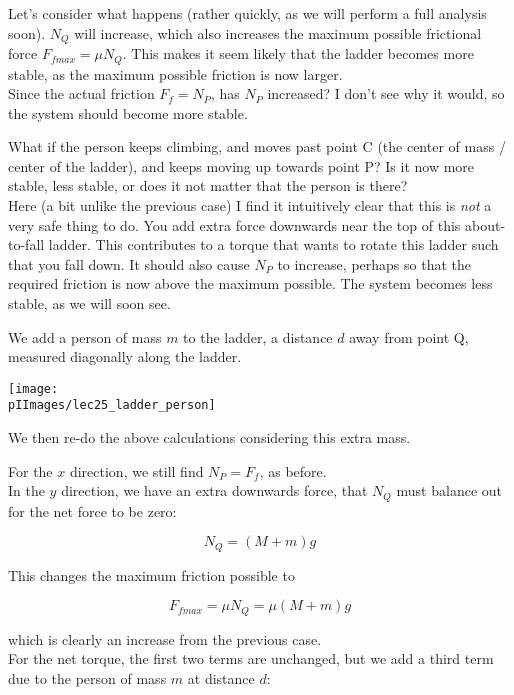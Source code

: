 Let's consider what happens (rather quickly, as we will perform a full analysis soon). $N_Q$ will increase, which also increases the maximum possible frictional force $F_{fmax} = \mu N_Q$. This makes it seem likely that the ladder becomes more stable, as the maximum possible friction is now larger.\\
Since the actual friction $F_f = N_P$, has $N_P$ increased? I don't see why it would, so the system should become more stable.

What if the person keeps climbing, and moves past point C (the center of mass / center of the ladder), and keeps moving up towards point P? Is it now more stable, less stable, or does it not matter that the person is there?\\
Here (a bit unlike the previous case) I find it intuitively clear that this is \emph{not} a very safe thing to do. You add extra force downwards near the top of this about-to-fall ladder. This contributes to a torque that wants to rotate this ladder such that you fall down. It should also cause $N_P$ to increase, perhaps so that the required friction is now above the maximum possible. The system becomes less stable, as we will soon see.

We add a person of mass $m$ to the ladder, a distance $d$ away from point Q, measured diagonally along the ladder.

\begin{center}
\texttt{[image: \\pIImages/lec25\_ladder\_person]}
\end{center}

We then re-do the above calculations considering this extra mass.

For the $x$ direction, we still find $N_P = F_f$, as before.\\
In the $y$ direction, we have an extra downwards force, that $N_Q$ must balance out for the net force to be zero:

\begin{equation}
N_Q = (M + m) g
\end{equation}

This changes the maximum friction possible to

\begin{equation}
F_{fmax} = \mu N_Q = \mu (M + m) g
\end{equation}

which is clearly an increase from the previous case.\\
For the net torque, the first two terms are unchanged, but we add a third term due to the person of mass $m$ at distance $d$:

